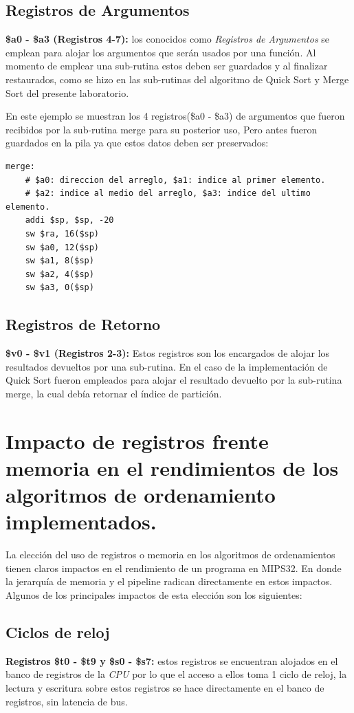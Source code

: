 \documentclass[12pt, a4paper]{article}
\begin{document}
        \subsection{Registros de Argumentos}
            \textbf{\$a0 - \$a3 (Registros 4-7):} los conocidos como \textit{Registros de Argumentos} se emplean para alojar los argumentos que serán usados por una función. Al momento de emplear una sub-rutina estos deben ser guardados y al finalizar restaurados, como se hizo en las sub-rutinas del algoritmo de Quick Sort y Merge Sort del presente laboratorio.
            
            En este ejemplo se muestran los 4 registros(\$a0 - \$a3) de argumentos que fueron recibidos por la sub-rutina merge para su posterior uso, Pero antes fueron guardados en la pila ya que estos datos deben ser preservados:
            \begin{lstlisting}
merge:
    # $a0: direccion del arreglo, $a1: indice al primer elemento.
    # $a2: indice al medio del arreglo, $a3: indice del ultimo elemento.
    addi $sp, $sp, -20
    sw $ra, 16($sp)
    sw $a0, 12($sp)
    sw $a1, 8($sp)
    sw $a2, 4($sp)
    sw $a3, 0($sp)
            \end{lstlisting}
        \subsection{Registros de Retorno}
            \textbf{\$v0 - \$v1 (Registros 2-3):} Estos registros son los encargados de alojar los resultados devueltos por una sub-rutina. En el caso de la implementación de Quick Sort fueron empleados para alojar el resultado devuelto por la sub-rutina merge, la cual debía retornar el índice de partición.
    \section{Impacto de registros frente memoria en el rendimientos de los algoritmos de ordenamiento implementados.}
        La elección del uso de registros o memoria en los algoritmos de ordenamientos tienen claros impactos en el rendimiento de un programa en MIPS32. En donde la jerarquía de memoria y el pipeline radican directamente en estos impactos. Algunos de los principales impactos de esta elección son los siguientes:
        \subsection{Ciclos de reloj}
            \textbf{Registros \$t0 - \$t9 y \$s0 - \$s7:} estos registros se encuentran alojados en el banco de registros de la \textit{CPU} por lo que el acceso a ellos toma 1 ciclo de reloj, la lectura y escritura sobre estos registros se hace directamente en el banco de registros, sin latencia de bus.
            
\end{document}
